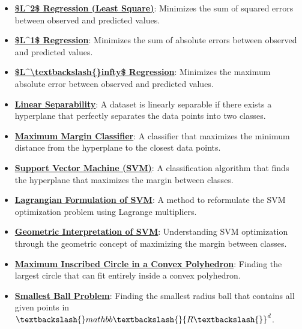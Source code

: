 \documentclass{article}%
\begin{document}
\begin{itemize}[leftmargin=*]%
\item \href{https://www.math.purdue.edu/~yipn/421/2024-10-22-Regression.pdf#page=4}{\textbf{\$L\^{}2\$ Regression (Least Square)}}: Minimizes the sum of squared errors between observed and predicted values.%
\item \href{https://www.math.purdue.edu/~yipn/421/2024-10-22-Regression.pdf#page=5}{\textbf{\$L\^{}1\$ Regression}}: Minimizes the sum of absolute errors between observed and predicted values.%
\item \href{https://www.math.purdue.edu/~yipn/421/2024-10-22-Regression.pdf#page=6}{\textbf{\$L\^{}\textbackslash{}textbackslash\{\}infty\$ Regression}}: Minimizes the maximum absolute error between observed and predicted values.%
\item \href{https://www.math.purdue.edu/~yipn/421/2024-10-22-Regression.pdf#page=8}{\textbf{Linear Separability}}: A dataset is linearly separable if there exists a hyperplane that perfectly separates the data points into two classes.%
\item \href{https://www.math.purdue.edu/~yipn/421/2024-10-22-Regression.pdf#page=9}{\textbf{Maximum Margin Classifier}}: A classifier that maximizes the minimum distance from the hyperplane to the closest data points.%
\item \href{https://www.math.purdue.edu/~yipn/421/2024-10-22-Regression.pdf#page=10}{\textbf{Support Vector Machine (SVM)}}: A classification algorithm that finds the hyperplane that maximizes the margin between classes.%
\item \href{https://www.math.purdue.edu/~yipn/421/2024-10-22-Regression.pdf#page=11}{\textbf{Lagrangian Formulation of SVM}}: A method to reformulate the SVM optimization problem using Lagrange multipliers.%
\item \href{https://www.math.purdue.edu/~yipn/421/2024-10-22-Regression.pdf#page=12}{\textbf{Geometric Interpretation of SVM}}: Understanding SVM optimization through the geometric concept of maximizing the margin between classes.%
\item \href{https://www.math.purdue.edu/~yipn/421/2024-10-22-Regression.pdf#page=15}{\textbf{Maximum Inscribed Circle in a Convex Polyhedron}}: Finding the largest circle that can fit entirely inside a convex polyhedron.%
\item \href{https://www.math.purdue.edu/~yipn/421/2024-10-22-Regression.pdf#page=22}{\textbf{Smallest Ball Problem}}: Finding the smallest radius ball that contains all given points in $\textbackslash{}mathbb\textbackslash{}{R\textbackslash{}}^d$.%
\end{itemize}%
\end{document}
